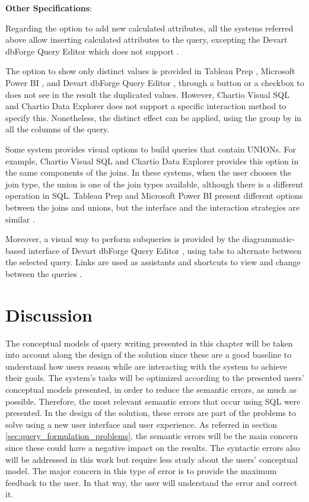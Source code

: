\textbf{Other Specifications}: 

Regarding the option to add new calculated attributes, all the systems referred above allow inserting calculated attributes to the query, excepting the Devart dbForge Query Editor which does not support \cite{visualSqlActions,tableauCalculatedField,powerBICommonQueryTasks}.

The option to show only distinct values is provided in Tableau Prep \cite{tableauPrep}, Microsoft Power BI \cite{powerBI}, and Devart dbForge Query Editor \cite{dbForgeQueryBuilder}, through a button or a checkbox to does not see in the result the duplicated values. However, Chartio Visual SQL \cite{chartioVisualSQL} and Chartio Data Explorer \cite{chartioDataExplorer} does not support a specific interaction method to specify this. Nonetheless, the distinct effect can be applied, using the group by in all the columns of the query.

Some system provides visual options to build queries that contain UNIONs. For example, Chartio Visual SQL \cite{chartioVisualSQL} and Chartio Data Explorer \cite{chartioDataExplorer} provides this option in the same components of the joins. In these systems, when the user chooses the join type, the union is one of the join types available, although there is a different operation in SQL. Tableau Prep \cite{tableauPrep} and Microsoft Power BI \cite{powerBI} present different options between the joins and unions, but the interface and the interaction strategies are similar \cite{tableauAggregateJoinOrUnionData,powerBIShapeAndCombineData}.

Moreover, a visual way to perform subqueries is provided by the diagrammatic-based interface of Devart dbForge Query Editor \cite{dbForgeQueryBuilder}, using tabs to alternate between the selected query. Links are used as assistants and shortcuts to view and change between the queries \cite{dbForgeSubqueriesOverview,dbForgeSubqueriesInFromClauses}.

\section{Discussion}
\label{sec:discussion}
The conceptual models of query writing presented in this chapter will be taken into account along the design of the solution since these are a good baseline to understand how users reason while are interacting with the system to achieve their goals. The system's tasks will be optimized according to the presented users' conceptual models presented, in order to reduce the semantic errors, as much as possible. Therefore, the most relevant semantic errors that occur using SQL were presented. In the design of the solution, these errors are part of the problems to solve using a new user interface and user experience. As referred in section \ref{sec:query_formulation_problems}, the semantic errors will be the main concern since these could have a negative impact on the results. The syntactic errors also will be addressed in this work but require less study about the users’ conceptual model. The major concern in this type of error is to provide the maximum feedback to the user. In that way, the user will understand the error and correct it.

